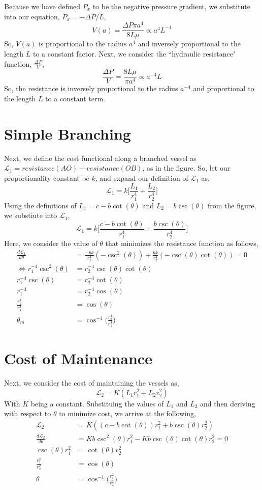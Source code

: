 \documentclass[letterpaper,10pt]{article}
\newcommand{\eL}{\mathcal{L}}
\begin{document}
Because we have defined $P_x$ to be the negative pressure gradient, we substitute into our equation, $P_x=-\Delta P/L$,
\[V(a)=\frac{\Delta P\pi a^4}{8L\mu}\propto a^4L^{-1}\]
So, $V(a)$ is proportional to the radius $a^4$ and inversely proportional to the length $L$ to a constant factor. Next, we consider the ``hydraulic resistance" function, $\frac{\Delta P}{V}$,
\[\frac{\Delta P}{V}=\frac{8L\mu}{\pi a^4}\propto a^{-4}L\]
So, the resistance is inversely proportional to the radius $a^{-4}$ and proportional to the length $L$ to a constant term.
\section*{Simple Branching}
Next, we define the cost functional along a branched vessel as $\eL_1=resistance(AO)+resistance(OB)$, as in the figure. So, let our proportionality constant be $k$, and expand our definition of $\eL_1$ as,
\[ \eL_1 = k\bigg[\frac{L_1}{r_1^4}+\frac{L_2}{r_2^4}\bigg] \]
Using the definitions of $L_1=c-b\cot(\theta)$ and $L_2=b\csc(\theta)$ from the figure, we substiute into $\eL_1$,
\[\eL_1=k\bigg[\frac{c-b\cot(\theta)}{r_1^4}+\frac{b\csc(\theta)}{r_2^4}\bigg]\]
Here, we consider the value of $\theta$ that minimizes the resistance function as follows,
\begin{align*}
\frac{d\eL_1}{d\theta}&=\frac{-bk}{r_1^4}(-\csc^2(\theta))+\frac{bk}{r_2^4}(-\csc(\theta)\cot(\theta))=0\\
\Leftrightarrow r_1^{-4}\csc^2(\theta)&=r_2^{-4}\csc(\theta)\cot(\theta)\\
r_1^{-4}\csc(\theta)&=r_2^{-4}\cot(\theta)\\
r_1^{-4}&=r_2^{-4}\cos(\theta)\\
\frac{r_2^4}{r_1^4}&=\cos(\theta)\\
\theta_m &= \cos^{-1}\bigg(\frac{r_2^4}{r_1^4}\bigg)
\end{align*}
\section*{Cost of Maintenance}
Next, we consider the cost of maintaining the vessels as,
\[\eL_2=K(L_1r_1^2+L_2r_2^2)\]
With $K$ being a constant. Substituing the values of $L_1$ and $L_2$ and then deriving with respect to $\theta$ to minimize cost, we arrive at the following,
\begin{align*}
\eL_2 &= K((c-b\cot(\theta))r_1^2+b\csc(\theta)r_2^2)\\
\frac{d\eL_2}{d\theta} &= Kb\csc^2(\theta)r_1^2-Kb\csc(\theta)\cot(\theta)r_2^2=0\\
\csc(\theta)r_1^2 &= \cot(\theta)r_2^2\\
\frac{r_1^2}{r_2^2} &= \cos(\theta)\\
\theta &= \cos^{-1}\bigg(\frac{r_1^2}{r_2^2}\bigg)
\end{align*}
\end{document}
